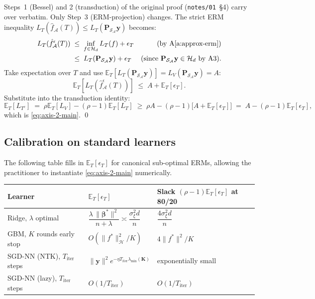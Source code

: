 \documentclass[11pt,a4paper]{article}
\theoremstyle{plain}
\theoremstyle{definition}
\theoremstyle{remark}
\newcommand{\by}{\mathbf{y}}
\newcommand{\bbeta}{\boldsymbol{\beta}}
\newcommand{\bP}{\mathbf{P}}
\newcommand{\bK}{\mathbf{K}}
\newcommand{\E}{\mathbb{E}}
\newcommand{\Scal}{\mathcal{S}}
\newcommand{\Acal}{\mathcal{A}}
\newcommand{\Hcal}{\mathcal{H}}
\begin{document}
Steps~1 (Bessel) and 2 (transduction) of the original proof
(\texttt{notes/01}~\S4) carry over verbatim. Only Step~3
(ERM-projection) changes. The strict ERM inequality
$L_T(\hat f_\Acal(T)) \le L_T(\bP_{\Scal_\Acal}\by)$ becomes:
\begin{align*}
    L_T(\hat f^{\epsilon}_\Acal(T))
    &\;\le\; \inf_{f \in \Hcal_d} L_T(f) + \epsilon_T
    & \text{(by A\ref{a:approx-erm})} \\
    &\;\le\; L_T(\bP_{\Scal_\Acal}\by) + \epsilon_T
    & \text{(since $\bP_{\Scal_\Acal}\by \in \Hcal_d$ by A3).}
\end{align*}
Take expectation over $T$ and use $\E_T[L_T(\bP_{\Scal_\Acal}\by)] =
L_V(\bP_{\Scal_\Acal}\by) = A$:
\begin{equation}
    \E_T[L_T(\hat f^{\epsilon}_\Acal(T))] \;\le\; A + \E_T[\epsilon_T].
    \label{eq:axis-2-step3}
\end{equation}
Substitute into the transduction identity:
\begin{equation*}
    \E_T[L_{T^c}] \;=\; \rho \E_T[L_V] - (\rho - 1) \E_T[L_T]
    \;\ge\; \rho A - (\rho - 1)\!\big[A + \E_T[\epsilon_T]\big]
    \;=\; A - (\rho - 1)\E_T[\epsilon_T],
\end{equation*}
which is \eqref{eq:axis-2-main}. \qed

\subsection{Calibration on standard learners}

The following table fills in $\E_T[\epsilon_T]$ for canonical
sub-optimal ERMs, allowing the practitioner to instantiate
\eqref{eq:axis-2-main} numerically.

\begin{center}
\begin{tabular}{l l l}
\hline
Learner & $\E_T[\epsilon_T]$ & Slack $(\rho-1)\E_T[\epsilon_T]$ at 80/20 \\
\hline
Ridge, $\lambda$ optimal & $\dfrac{\lambda\,\|\bbeta^*\|^2}{n+\lambda} \asymp \dfrac{\sigma_\xi^2 d}{n}$ & $\dfrac{4\sigma_\xi^2 d}{n}$ \\[1ex]
GBM, $K$ rounds early stop & $O(\|f^*\|_{\Hcal}^2/K)$ & $4 \|f^*\|^2/K$ \\[1ex]
SGD-NN (NTK), $T_{\mathrm{iter}}$ steps & $\|\by\|^2 e^{-\eta T_{\mathrm{iter}} \lambda_{\min}(\bK)}$ & exponentially small \\[1ex]
SGD-NN (lazy), $T_{\mathrm{iter}}$ steps & $O(1/T_{\mathrm{iter}})$ & $O(1/T_{\mathrm{iter}})$ \\
\hline
\end{tabular}
\end{center}
\end{document}
